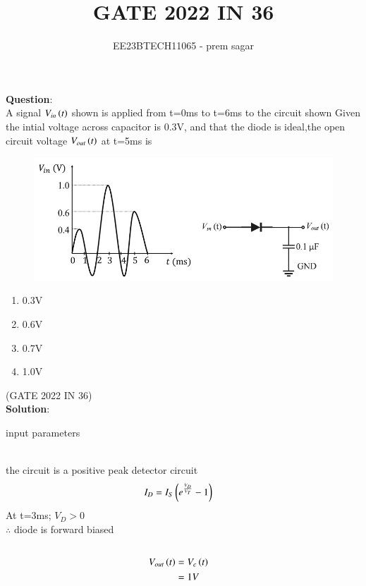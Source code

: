 \documentclass[journal,12pt,twocolumn]{IEEEtran}
\theoremstyle{remark}
\begin{document}

\vspace{3cm}

\title{GATE 2022 IN 36}
\author{EE23BTECH11065 - prem sagar}
\maketitle
\newpage

\bigskip

\renewcommand{\thefigure}{\theenumi}
\renewcommand{\thetable}{\theenumi}
\textbf{Question}:
\\A signal $V_{in}\left(t\right)$ shown is applied from t=0ms to t=6ms to the circuit shown Given the intial voltage across capacitor is 0.3V, and that the diode is ideal,the open circuit voltage $V_{out}\left(t\right)$ at t=5ms is
\begin{figure}[h]
    \centering
    \includegraphics[width=1\linewidth]{2022/IN/36/figs/figuree.png}
    \caption{ }
\end{figure}
\begin{enumerate}
    \item 0.3V
    \item0.6V
    \item0.7V
    \item1.0V
\end{enumerate}
\hfill(GATE 2022 IN 36)
\\\textbf{Solution}:
\fi
\begin{table}[!ht]
\def\arraystretch{1.5}
   \centering
   
    \caption{input parameters}
 \end{table}
\\ the circuit is a positive peak detector circuit  
\begin{align}
I_D&=I_S\left(e^\frac{V_D}{V_T}-1\right)
\end{align}
At t=3ms; $V_D>0$
\\$\therefore$ diode is forward biased
\begin{align}
\\V_{out}\left(t\right)&=V_c\left(t\right)
\\&=1V
\end{align}
\end{document}
